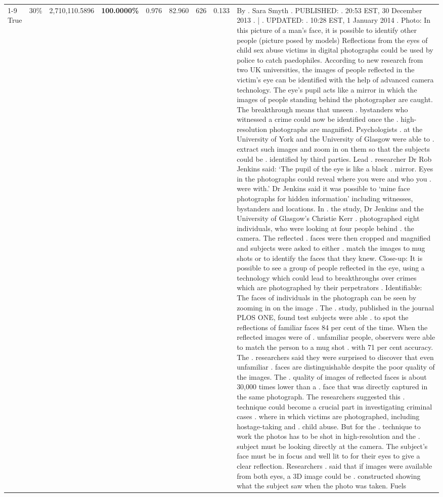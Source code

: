 \begin{table}[H]
\begin{tabular}{lllrlllll}
\cline{1-9} \cline{2-9}
True & 30\% & 2,710,110.5896 & \bfseries \color{red} 100.0000\% & 0.976 & 82.960 & 626 & 0.133 & By . Sara Smyth . PUBLISHED: . 20:53 EST, 30 December 2013 . | . UPDATED: . 10:28 EST, 1 January 2014 . Photo: In this picture of a man's face, it is possible to identify other people (picture posed by models) Reflections from the eyes of child sex abuse victims in digital photographs could be used by police to catch paedophiles. According to new research from two UK universities, the images of people reflected in the victim's eye can be identified with the help of advanced camera technology. The eye's pupil acts like a mirror in which the images of people standing behind the photographer are caught. The breakthrough means that unseen . bystanders who witnessed a crime could now be identified once the . high-resolution photographs are magnified. Psychologists . at the University of York and the University of Glasgow were able to . extract such images and zoom in on them so that the subjects could be . identified by third parties. Lead . researcher Dr Rob Jenkins said: ‘The pupil of the eye is like a black . mirror. Eyes in the photographs could reveal where you were and who you . were with.' Dr Jenkins said it was possible to ‘mine face photographs for hidden information' including witnesses, bystanders and locations. In . the study, Dr Jenkins and the University of Glasgow's Christie Kerr . photographed eight individuals, who were looking at four people behind . the camera. The reflected . faces were then cropped and magnified and subjects were asked to either . match the images to mug shots or to identify the faces that they knew. Close-up: It is possible to see a group of people reflected in the eye, using a technology which could lead to breakthroughs over crimes which are photographed by their perpetrators . Identifiable: The faces of individuals in the photograph can be seen by zooming in on the image . The . study, published in the journal PLOS ONE, found test subjects were able . to spot the reflections of familiar faces 84 per cent of the time. When the reflected images were of . unfamiliar people, observers were able to match the person to a mug shot . with 71 per cent accuracy. The . researchers said they were surprised to discover that even unfamiliar . faces are distinguishable despite the poor quality of the images. The . quality of images of reflected faces is about 30,000 times lower than a . face that was directly captured in the same photograph. The researchers suggested this . technique could become a crucial part in investigating criminal cases . where in which victims are photographed, including hostage-taking and . child abuse. But for the . technique to work the photos has to be shot in high-resolution and the . subject must be looking directly at the camera. The subject's face must be in focus and well lit to for their eyes to give a clear reflection. Researchers . said that if images were available from both eyes, a 3D image could be . constructed showing what the subject saw when the photo was taken. Fuels \\

\end{tabular}
\end{table}
